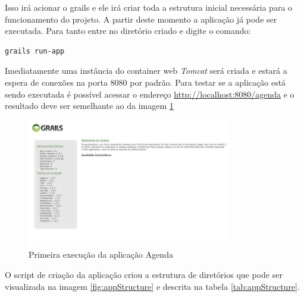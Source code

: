 \documentclass[12pt]{article}
\begin{document}
    Isso irá acionar o grails e ele irá criar toda a estrutura inicial necessária para
    o funcionamento do projeto. A partir deste momento a aplicação já pode ser 
    executada. Para tanto entre no diretório criado e digite o comando:
    
    \begin{lstlisting}[basicstyle={\small \ttfamily}]
        grails run-app
    \end{lstlisting}
    
    Imediatamente uma instância do container web \emph{Tomcat} será criada e estará a
    espera de conexões na porta 8080 por padrão. Para testar se a aplicação está
    sendo executada é possível acessar o endereço \url{http://localhost:8080/agenda} 
    e o resultado deve ser semelhante ao da imagem \ref{fig:firstRun}
    
    \begin{figure}[h!]
    \centering
    \includegraphics[width=0.8\textwidth]{images/firstRun.jpg}
    \caption{Primeira execução da aplicação Agenda}
    \label{fig:firstRun}
    \end{figure}
    
    O script de criação da aplicação criou a estrutura de diretórios que pode ser
    visualizada na imagem \ref{fig:appStructure} e descrita na tabela \ref{tab:appStructure}.
    
\end{document}
